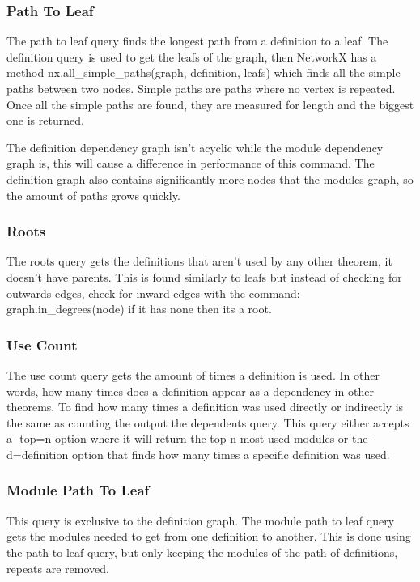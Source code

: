 \subsubsection{Path To Leaf}

The path to leaf query finds the longest path from a definition to a leaf. The
definition query is used to get the leafs of the graph, then NetworkX has a
method \textsf{nx.all\_simple\_paths(graph, definition, leafs)} which finds all
the simple paths between two nodes. Simple paths are paths where no vertex is
repeated. Once all the simple paths are found, they are measured for length and
the biggest one is returned.

The definition dependency graph isn't acyclic while the module dependency graph
is, this will cause a difference in performance of this command. The definition
graph also contains significantly more nodes that the modules graph, so the
amount of paths grows quickly.

\subsubsection{Roots}

The roots query gets the definitions that aren't used by any other theorem, it
doesn't have parents. This is found similarly to leafs but instead of checking
for outwards edges, check for inward edges with the command:
\textsf{graph.in\_degrees(node)} if it has none then its a root.

\subsubsection{Use Count}

The use count query gets the amount of times a definition is used. In other
words, how many times does a definition appear as a dependency in other
theorems. To find how many times a definition was used directly or indirectly
is the same as counting the output the dependents query. This query either
accepts a -top=n option where it will return the top n most used modules or the
-d=definition option that finds how many times a specific definition was used.

\subsubsection{Module Path To Leaf}

This query is exclusive to the definition graph. The module path to leaf query
gets the modules needed to get from one definition to another. This is done
using the path to leaf query, but only keeping the modules of the path of
definitions, repeats are removed.

